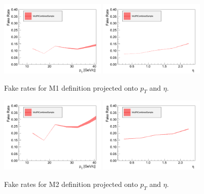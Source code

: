 \begin{figure}[!htbp]
\begin{center}
\includegraphics[width=0.45\textwidth]{figures/muon_frpt_m1.pdf}
\includegraphics[width=0.45\textwidth]{figures/muon_freta_m1.pdf}
\caption{Fake rates for M1 definition projected onto $p_T$ and $\eta$.}
\label{fig:mu_fr_iso1_jet15}
\end{center}
\end{figure}

\begin{figure}[!htbp]
\begin{center}
\includegraphics[width=0.45\textwidth]{figures/muon_frpt_m2.pdf}
\includegraphics[width=0.45\textwidth]{figures/muon_freta_m2.pdf}
\caption{Fake rates for M2 definition projected onto $p_T$ and $\eta$.}
\label{fig:mu_fr_iso04_jet15}
\end{center}
\end{figure}



